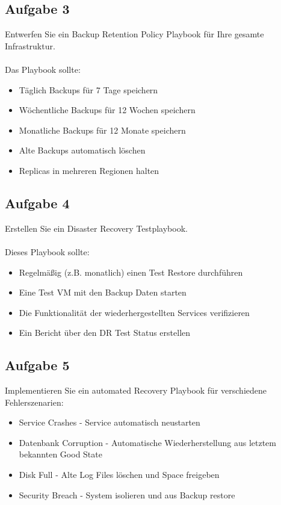 \documentclass{article}
\begin{document}
    \subsection{Aufgabe 3}
    Entwerfen Sie ein Backup Retention Policy Playbook für Ihre gesamte Infrastruktur.
    \\ \\
    Das Playbook sollte:
    \begin{itemize}
        \item Täglich Backups für 7 Tage speichern
        \item Wöchentliche Backups für 12 Wochen speichern
        \item Monatliche Backups für 12 Monate speichern
        \item Alte Backups automatisch löschen
        \item Replicas in mehreren Regionen halten
    \end{itemize}

    \subsection{Aufgabe 4}
    Erstellen Sie ein Disaster Recovery Testplaybook.
    \\ \\
    Dieses Playbook sollte:
    \begin{itemize}
        \item Regelmäßig (z.B. monatlich) einen Test Restore durchführen
        \item Eine Test VM mit den Backup Daten starten
        \item Die Funktionalität der wiederhergestellten Services verifizieren
        \item Ein Bericht über den DR Test Status erstellen
    \end{itemize}

    \subsection{Aufgabe 5}
    Implementieren Sie ein automated Recovery Playbook für verschiedene Fehlerszenarien:
    \begin{itemize}
        \item Service Crashes - Service automatisch neustarten
        \item Datenbank Corruption - Automatische Wiederherstellung aus letztem bekannten Good State
        \item Disk Full - Alte Log Files löschen und Space freigeben
        \item Security Breach - System isolieren und aus Backup restore
    \end{itemize}
\end{document}
